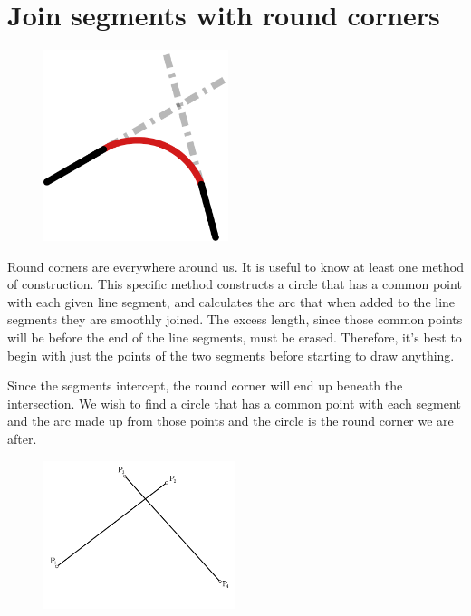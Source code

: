 \documentclass[12pt,openany,a4,usenames,dvipsnames]{book}
\begin{document}
\chapter{Join segments with round corners}
\begin{figure}
    \vspace{-60pt}
  \begin{center}
    \includegraphics[width=0.48\textwidth,keepaspectratio]{figures/fillet_main.pdf}
  \end{center}
\end{figure}
Round corners are everywhere around us. It is useful to know at least one method of construction. This specific method constructs a circle that has a common point with each given line segment, and calculates the arc that when added to the line segments they are smoothly joined. The excess length, since those common points will be before the end of the line segments, must be erased. Therefore, it's best to begin with just the points of the two segments before starting to draw anything.

Since the segments intercept, the round corner will end up beneath the intersection. We wish to find a circle
that has a common point with each segment and the arc made up from those points and the circle is the round corner we are after.

\begin{figure}[H]
  \centering{}
\includegraphics[width=0.5\textwidth,keepaspectratio]{figures/fillet_1.pdf}
\end{figure}
\end{document}
